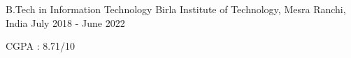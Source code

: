 

\begin{cventries}

  \cventry
    {B.Tech in Information Technology} %
    {Birla Institute of Technology, Mesra} %
    {Ranchi, India} %
    {July 2018 - June 2022} %
    {
      \begin{cvitems} %
        \item {CGPA : 8.71/10}
      \end{cvitems}
    }

\end{cventries}

